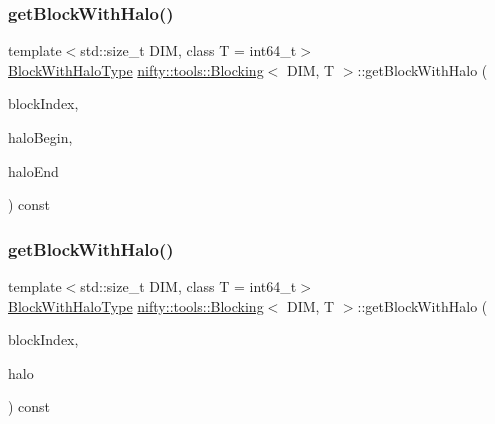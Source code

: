\subsubsection{\texorpdfstring{get\+Block\+With\+Halo()}{getBlockWithHalo()}\hspace{0.1cm}{\footnotesize\ttfamily [1/2]}}
{\footnotesize\ttfamily template$<$std\+::size\+\_\+t D\+IM, class T  = int64\+\_\+t$>$ \\
\hyperlink{classnifty_1_1tools_1_1Blocking_abebd9361d89cc399bc495861fa4e331d}{Block\+With\+Halo\+Type} \hyperlink{classnifty_1_1tools_1_1Blocking}{nifty\+::tools\+::\+Blocking}$<$ D\+IM, T $>$\+::get\+Block\+With\+Halo (\begin{DoxyParamCaption}\item[{const uint64\+\_\+t}]{block\+Index,  }\item[{const \hyperlink{classnifty_1_1tools_1_1Blocking_a5f8df3d4cdf09803217d729a04018fb3}{Vector\+Type} \&}]{halo\+Begin,  }\item[{const \hyperlink{classnifty_1_1tools_1_1Blocking_a5f8df3d4cdf09803217d729a04018fb3}{Vector\+Type} \&}]{halo\+End }\end{DoxyParamCaption}) const\hspace{0.3cm}{\ttfamily [inline]}}

\mbox{\label{classnifty_1_1tools_1_1Blocking_aeeb540a2fe69cd5f3e89047daa922f13}} 
\subsubsection{\texorpdfstring{get\+Block\+With\+Halo()}{getBlockWithHalo()}\hspace{0.1cm}{\footnotesize\ttfamily [2/2]}}
{\footnotesize\ttfamily template$<$std\+::size\+\_\+t D\+IM, class T  = int64\+\_\+t$>$ \\
\hyperlink{classnifty_1_1tools_1_1Blocking_abebd9361d89cc399bc495861fa4e331d}{Block\+With\+Halo\+Type} \hyperlink{classnifty_1_1tools_1_1Blocking}{nifty\+::tools\+::\+Blocking}$<$ D\+IM, T $>$\+::get\+Block\+With\+Halo (\begin{DoxyParamCaption}\item[{const uint64\+\_\+t}]{block\+Index,  }\item[{const \hyperlink{classnifty_1_1tools_1_1Blocking_a5f8df3d4cdf09803217d729a04018fb3}{Vector\+Type} \&}]{halo }\end{DoxyParamCaption}) const\hspace{0.3cm}{\ttfamily [inline]}}

